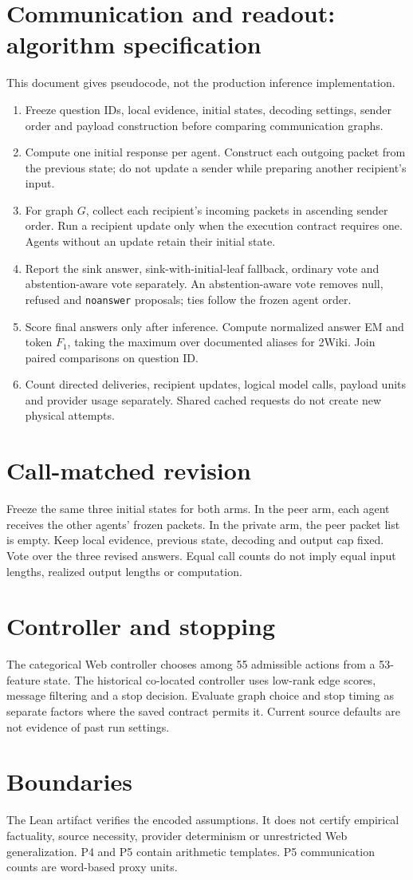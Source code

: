 \documentclass{article}
\begin{document}
\section*{Communication and readout: algorithm specification}
This document gives pseudocode, not the production inference implementation.
\begin{enumerate}
\item Freeze question IDs, local evidence, initial states, decoding settings, sender order and payload construction before comparing communication graphs.
\item Compute one initial response per agent. Construct each outgoing packet from the previous state; do not update a sender while preparing another recipient's input.
\item For graph $G$, collect each recipient's incoming packets in ascending sender order. Run a recipient update only when the execution contract requires one. Agents without an update retain their initial state.
\item Report the sink answer, sink-with-initial-leaf fallback, ordinary vote and abstention-aware vote separately. An abstention-aware vote removes null, refused and \texttt{noanswer} proposals; ties follow the frozen agent order.
\item Score final answers only after inference. Compute normalized answer EM and token $F_1$, taking the maximum over documented aliases for 2Wiki. Join paired comparisons on question ID.
\item Count directed deliveries, recipient updates, logical model calls, payload units and provider usage separately. Shared cached requests do not create new physical attempts.
\end{enumerate}
\section*{Call-matched revision}
Freeze the same three initial states for both arms. In the peer arm, each agent receives the other agents' frozen packets. In the private arm, the peer packet list is empty. Keep local evidence, previous state, decoding and output cap fixed. Vote over the three revised answers. Equal call counts do not imply equal input lengths, realized output lengths or computation.
\section*{Controller and stopping}
The categorical Web controller chooses among 55 admissible actions from a 53-feature state. The historical co-located controller uses low-rank edge scores, message filtering and a stop decision. Evaluate graph choice and stop timing as separate factors where the saved contract permits it. Current source defaults are not evidence of past run settings.
\section*{Boundaries}
The Lean artifact verifies the encoded assumptions. It does not certify empirical factuality, source necessity, provider determinism or unrestricted Web generalization. P4 and P5 contain arithmetic templates. P5 communication counts are word-based proxy units.
\end{document}
